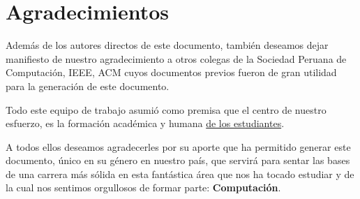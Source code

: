 \chapter*{Agradecimientos}\label{chap:cs-ack}
%

Además de los autores directos de este documento, también deseamos dejar manifiesto de nuestro 
agradecimiento a otros colegas de la Sociedad Peruana de Computación, IEEE, ACM cuyos 
documentos previos fueron de gran utilidad para la generación de este documento. 

Todo este equipo de trabajo asumió como premisa que el centro de nuestro esfuerzo, 
es la formación académica y humana \underline{de los estudiantes}.

A todos ellos deseamos agradecerles por su aporte que ha permitido generar 
este documento, único en su género en nuestro país, que servirá para sentar las 
bases de una carrera más sólida en esta fantástica área que nos ha tocado estudiar y 
de la cual nos sentimos orgullosos de formar parte: \textbf{Computación}.
